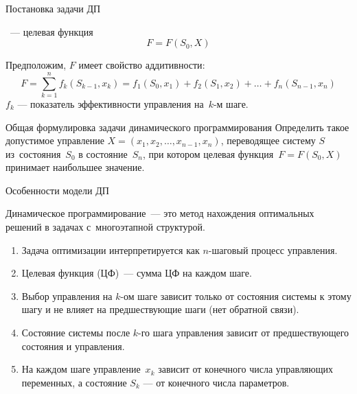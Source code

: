 \documentclass[unicode,11pt,notheorems,xcolor=table]{beamer}
\begin{document}
\begin{frame}{Постановка задачи ДП}

~--- целевая функция
$$
	F = F(S_0,X)
$$



Предположим, $F$ имеет \alert{свойство аддитивности}:
$$
		F=\sum_{k=1}^n f_k(S_{k-1},x_k) = f_1(S_0,x_1)+f_2(S_1,x_2)+\ldots+ f_n(S_{n-1},x_n)
$$
$f_k$ --- показатель эффективности управления на~$k$-м шаге.

\bigskip

\begin{block}{Общая формулировка задачи динамического программирования}
	Определить такое допустимое управление $X = (x_1,x_2,\ldots,x_{n-1},x_n)$, переводящее систему  $S$  из~состояния~$S_0$  в состояние~$S_n$, при котором целевая функция~$F=F(S_0,X)$ принимает наибольшее значение.
\end{block}
\end{frame}

\begin{frame}{Особенности модели ДП}{}

 	\alert{Динамическое программирование}~--- это метод нахождения оптимальных решений в задачах с~\alert{многоэтапной структурой}. 

\begin{enumerate}
\item 
	Задача оптимизации интерпретируется как $n$-шаговый процесс управления.
\item 
	Целевая функция (ЦФ)~--- сумма ЦФ на каждом шаге.
\item 
	Выбор управления на $k$-ом шаге зависит только от состояния системы к этому шагу и не влияет на предшествующие шаги (нет обратной связи).
\item 
	Состояние системы после $k$-го шага управления зависит от предшествующего состояния и управления.
\item 
	На каждом шаге управление~$x_k$  зависит от конечного числа управляющих переменных, а состояние  $S_k$ --- от конечного числа параметров.
\end{enumerate}

\end{frame}
\end{document}
